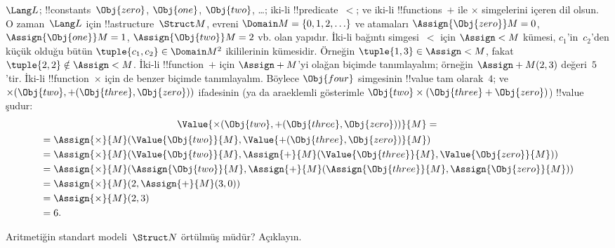 \begin{ex}
$\Lang L$; !!{constant}s~$\Obj{zero}$, $\Obj{one}$, $\Obj{two}$,
\dots; iki-li !!{predicate}~$<$; ve iki-li !!{function}s~$+$ ile
$\times$ simgelerini içeren dil olsun. O zaman~$\Lang L$ için
!!a{structure}~$\Struct M$, evreni
$\Domain M=\{0,1,2,\ldots\}$ ve atamaları
$\Assign{\Obj{zero}}M=0$, $\Assign{\Obj{one}}M=1$,
$\Assign{\Obj{two}}M=2$ vb. olan yapıdır. İki-li bağıntı simgesi~$<$
için $\Assign< M$ kümesi, $c_1$'in~$c_2$'den küçük olduğu bütün
$\tuple{c_1,c_2}\in\Domain M^2$ ikililerinin kümesidir. Örneğin
$\tuple{1,3}\in\Assign< M$, fakat $\tuple{2,2}\notin\Assign< M$.
İki-li !!{function}~$+$ için $\Assign+M$'yi olağan biçimde
tanımlayalım; örneğin $\Assign+M(2,3)$ değeri~$5$'tir. İki-li
!!{function}~$\times$ için de benzer biçimde tanımlayalım. Böylece
$\Obj{four}$ simgesinin !!{value} tam olarak~$4$; ve
$\times(\Obj{two},+(\Obj{three},\Obj{zero}))$ ifadesinin (ya da
araeklemli gösterimle
$\Obj{two}\times(\Obj{three}+\Obj{zero})$) !!{value} şudur:
\begin{multline*}
\Value{\times(\Obj{two}, +(\Obj{three},\Obj{zero}))}{M} =\\
\begin{aligned}
& =\Assign{\times}{M}(\Value{\Obj{two}}{M}, \Value{+(\Obj{three}, \Obj{zero})}{M})\\
& = \Assign{\times}{M}(\Value{\Obj{two}}{M}, \Assign{+}{M}(\Value{\Obj{three}}{M},
\Value{\Obj{zero}}{M})) \\
& = \Assign{\times}{M}(\Assign{\Obj{two}}{M}, \Assign{+}{M}(\Assign{\Obj{three}}{M},
\Assign{\Obj{zero}}{M})) \\
& = \Assign{\times}{M}(2, \Assign{+}{M}(3, 0)) \\
& = \Assign{\times}{M}(2, 3) \\
& = 6.
\end{aligned}
\end{multline*}
\end{ex}

\begin{prob}
Aritmetiğin standart modeli~$\Struct N$ örtülmüş müdür? Açıklayın.
\end{prob}

